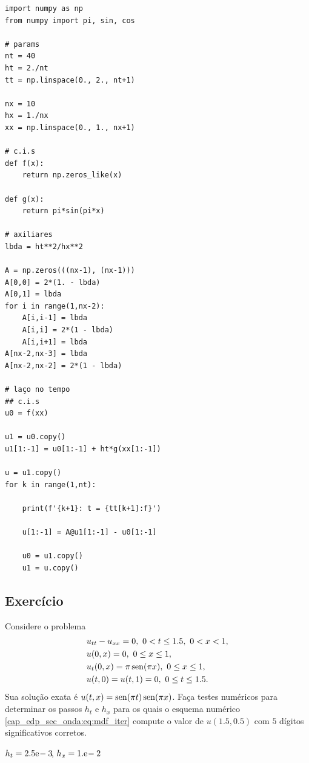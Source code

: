 \begin{ex}
\begin{lstlisting}
import numpy as np
from numpy import pi, sin, cos

# params
nt = 40
ht = 2./nt
tt = np.linspace(0., 2., nt+1)

nx = 10
hx = 1./nx
xx = np.linspace(0., 1., nx+1)

# c.i.s
def f(x):
    return np.zeros_like(x)

def g(x):
    return pi*sin(pi*x)

# axiliares
lbda = ht**2/hx**2

A = np.zeros(((nx-1), (nx-1)))
A[0,0] = 2*(1. - lbda)
A[0,1] = lbda
for i in range(1,nx-2):
    A[i,i-1] = lbda
    A[i,i] = 2*(1 - lbda)
    A[i,i+1] = lbda
A[nx-2,nx-3] = lbda
A[nx-2,nx-2] = 2*(1 - lbda)

# laço no tempo
## c.i.s
u0 = f(xx)

u1 = u0.copy()
u1[1:-1] = u0[1:-1] + ht*g(xx[1:-1])

u = u1.copy()
for k in range(1,nt):
    
    print(f'{k+1}: t = {tt[k+1]:f}')

    u[1:-1] = A@u1[1:-1] - u0[1:-1]

    u0 = u1.copy()
    u1 = u.copy()
\end{lstlisting}
\end{ex}

\subsection{Exercício}

\begin{exer}
  Considere o problema
  \begin{subequations}
    \begin{align}
      &u_{tt} - u_{xx} = 0, ~0 < t \leq 1.5, ~0< x < 1,\\
      &u(0,x) = 0, ~0\leq x \leq 1,\\
      &u_t(0,x) = \pi\operatorname{sen}(\pi x), ~0\leq x \leq 1,\\
      &u(t,0) = u(t,1) = 0, ~0\leq t \leq 1.5.
    \end{align}
  \end{subequations}
  Sua solução exata é $u(t,x) = \operatorname{sen}(\pi t)\operatorname{sen}(\pi x)$. Faça testes numéricos para determinar os passos $h_t$ e $h_x$ para os quais o esquema numérico \eqref{cap_edp_sec_onda:eq:mdf_iter} compute o valor de $u(1.5, 0.5)$ com $5$ dígitos significativos corretos.
\end{exer}
\begin{resp}
  $h_t = 2.5\mathrm{e}\!-3\!$, $h_x = 1.\mathrm{e}\!-2\!$
\end{resp}

